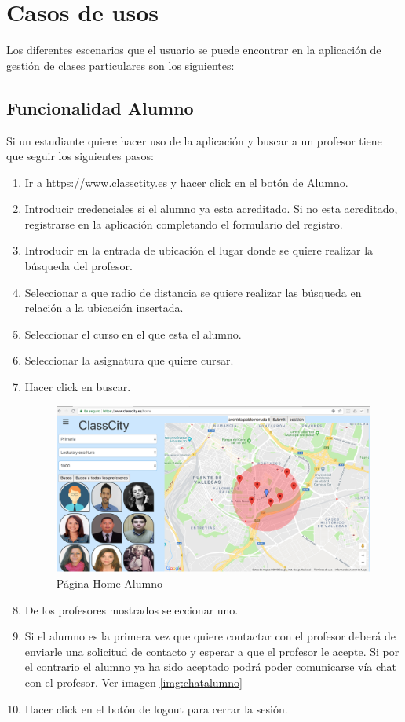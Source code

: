 \section{Casos de usos}

Los diferentes escenarios que el usuario se puede encontrar en la aplicación de gestión de clases particulares son los siguientes:

\subsection{Funcionalidad Alumno}

Si un estudiante quiere hacer uso de la aplicación y buscar a un profesor tiene que seguir los siguientes pasos:
\begin{enumerate}
\item Ir a https://www.classctity.es y hacer click en el botón de Alumno.
\item Introducir credenciales si el alumno ya esta acreditado. Si no esta acreditado, registrarse en la aplicación completando el formulario del registro.
\item Introducir en la entrada de ubicación el lugar donde se quiere realizar la búsqueda del profesor.
\item Seleccionar a que radio de distancia se quiere realizar las búsqueda en relación a la ubicación insertada.
\item Seleccionar el curso en el que esta el alumno.
\item Seleccionar la asignatura que quiere cursar.
\item Hacer click en buscar.
\begin{figure}[!h]
    \centering
    \includegraphics[width=160mm]{img/templates/buscarprof.png}
    \caption{Página Home Alumno}
\end{figure}
\item De los profesores mostrados seleccionar uno.
\item Si el alumno es la primera vez que quiere contactar con el profesor deberá de enviarle una solicitud de contacto y esperar a que el profesor le acepte. Si por el contrario el alumno ya ha sido aceptado podrá poder comunicarse vía chat con el profesor. Ver imagen \ref{img:chatalumno}
\item Hacer click en el botón de logout para cerrar la sesión.
\end{enumerate}

